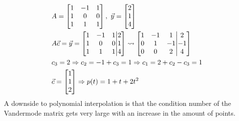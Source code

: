 \documentclass[11pt, fleqn]{article}
\begin{document}
\begin{align*}
    &A=\matrixx{1 & -1 & 1\\ 1 & 0 & 0\\ 1 & 1 & 1},\ \vec{y}=\matrixx{2\\1\\4}\\
    &A\vec{c}=\vec{y}=\augmatrix{1 & -1 & 1\\ 1 & 0 & 0\\ 1 & 1 & 1}{2\\1\\4}\leadsto\augmatrix{1 & -1 & 1\\ 0 & 1 & -1\\ 0 & 0 & 2}{2\\-1\\4}\\
    &c_3=2\Ra c_2=-1+c_3=1\Ra c_1=2+c_2-c_3=1\\
    &\vec{c}=\matrixx{1\\1\\2}\Ra p(t)=1+t+2t^2
\end{align*}
A downside to polynomial interpolation is that the condition number of the Vandermode matrix gets very large with an increase in the amount of points.
\end{document}
